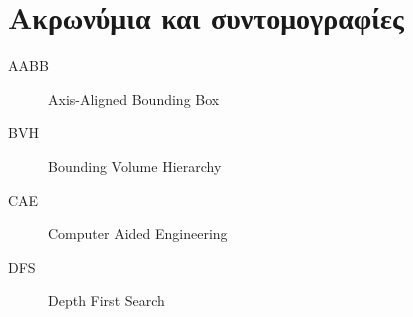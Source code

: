 \chapter{Ακρωνύμια και συντομογραφίες}

\begin{description}
  \item[AABB] Axis-Aligned Bounding Box
  \item[BVH] Bounding Volume Hierarchy
  \item[CAE] Computer Aided Engineering
  \item[DFS] Depth First Search
\end{description}
